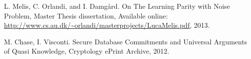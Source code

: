 \documentclass[dvips,12pt]{article}
\begin{document}
\begin{thebibliography}{99}
	L. Melis, C. Orlandi, and I. Damg{\aa}rd. 
	On The Learning Parity with Noise Problem,
	Master Thesis dissertation,
	Available online: {\url{http://www.cs.au.dk/~orlandi/masterprojects/LucaMelis.pdf}},
	2013.

	M. Chase, I. Visconti.
	Secure Database Commitments and Universal Arguments of Quasi Knowledge,
	Cryptology ePrint Archive,
	2012.	



\end{thebibliography}
\end{document}
